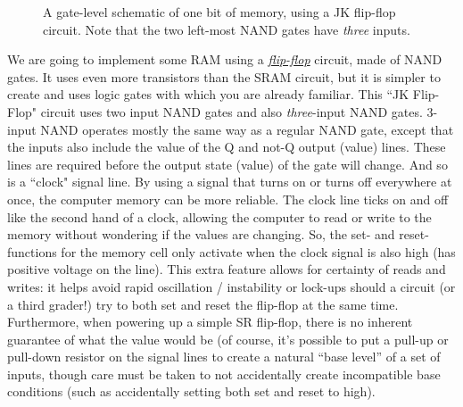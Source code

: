 \begin{figure}
  \begin{center}
  
  \caption{A gate-level schematic of one bit of memory, using a JK flip-flop circuit. Note that the two left-most NAND gates have \emph{three} inputs.}
  \end{center}
\end{figure}


We are going to implement some RAM using a {\color{webblue}\href{https://www.electronics-tutorials.ws/sequential/seq_2.html}{\emph{flip-flop}}} circuit, made of NAND gates.
It uses even more transistors than the SRAM circuit, but it is simpler to create and uses logic gates with which you are already familiar. This ``JK Flip-Flop" circuit uses
two input NAND gates and also \emph{three}-input NAND gates. 3-input NAND operates mostly
the same way as a regular NAND gate, except that the inputs also include the value of the 
Q and not-Q output (value) lines. 
These lines are required before the output state (value) of the gate will change. And so is a ``clock" signal line. By using a signal that turns on or turns off everywhere at once, the computer memory can be more reliable. The clock line ticks on and off like the second hand of a clock, allowing the computer to read or write to the memory without wondering if the values are changing.
So, the set- and reset- functions for the memory cell
only activate when the clock signal is also high (has positive voltage on the line).
This extra feature allows for certainty of reads and writes: it helps
avoid rapid oscillation / instability or lock-ups should a circuit (or a third
grader!) try to both set and reset the
flip-flop at the same time. Furthermore, when powering up a simple SR flip-flop,
there is no inherent guarantee of what the value would be (of course, it's
possible to put a pull-up or pull-down resistor on the signal lines to create
a natural ``base level'' of a set of inputs, though care must be taken to 
not accidentally create incompatible base conditions (such as accidentally setting
both set and reset to high).









